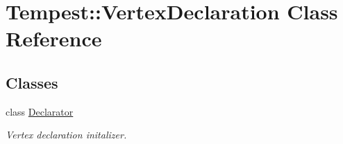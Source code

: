 \hypertarget{class_tempest_1_1_vertex_declaration}{\section{Tempest\+:\+:Vertex\+Declaration Class Reference}
\label{class_tempest_1_1_vertex_declaration}
}
\subsection*{Classes}
\begin{DoxyCompactItemize}
\item 
class \hyperlink{class_tempest_1_1_vertex_declaration_1_1_declarator}{Declarator}
\begin{DoxyCompactList}\small\item\em Vertex declaration initalizer. \end{DoxyCompactList}\end{DoxyCompactItemize}
